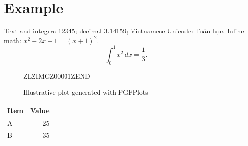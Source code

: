 \documentclass{article}
\begin{document}
\section{Example}
Text and integers 12345; decimal 3.14159; Vietnamese Unicode: Toán học.
Inline math: $x^2+2x+1=(x+1)^2$.
\begin{equation}
\int_0^1 x^2\,dx=\frac{1}{3}.
\end{equation}
\begin{figure}[ht]
\centering


ZLZIMGZ00001ZEND


\caption{Illustrative plot generated with PGFPlots.}
\end{figure}
\begin{tabular}{|l|r|}
\hline Item & Value \\ \hline A & 25 \\ B & 35 \\ \hline
\end{tabular}
\end{document}
